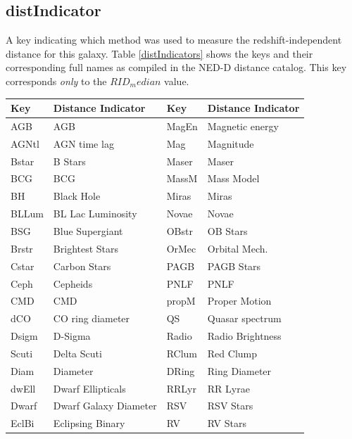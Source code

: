 \documentclass[iop]{emulateapj-rtx4}
\begin{document}
\subsection{distIndicator} \label{distIndicator}
A key indicating which method was used to measure the redshift-independent distance for this galaxy. Table \ref{distIndicators} shows the keys and their corresponding full names as compiled in the NED-D distance catalog. This key corresponds \textit{only} to the $RID_median$ value.

\begin{table}[ht]\footnotesize
\begin{center}
\begin{tabular}{l l | l l}
 \hline \hline
    Key       &	Distance Indicator		&	Key		&	Distance Indicator 	\\
  \hline \hline 
    AGB	&	AGB					&	MagEn    	&	Magnetic energy    	\\
    AGNtl	&	AGN time lag    		&	Mag    	&	Magnitude    	\\
    Bstar	&	B Stars				&	Maser    	&	Maser    	\\
    BCG	&	BCG					&	MassM    	&	Mass Model    	\\
    BH	&	Black Hole			&	Miras   	&	Miras    	\\
    BLLum	&	BL Lac Luminosity		&	Novae    	&	Novae    	\\
    BSG    	&	Blue Supergiant		&	OBstr    	&	OB Stars    	\\
    Brstr    	&	Brightest Stars    		&	OrMec    	&	Orbital Mech.    	\\
    Cstar    	&	Carbon Stars    			&	PAGB    	&	PAGB Stars    	\\
    Ceph    	&	Cepheids				&	PNLF    	&	PNLF    	\\
    CMD    	&	CMD					&	propM    	&	Proper Motion    	\\
    dCO    	&	CO ring diameter		&	QS    	&	Quasar spectrum    	\\
    Dsigm	&	D-Sigma				&	Radio    	&	Radio Brightness    	\\
    Scuti	&	Delta Scuti    			&	RClum    	&	Red Clump    	\\
    Diam	&	Diameter				&	DRing    	&	Ring Diameter    	\\
    dwEll	&	Dwarf Ellipticals    		&	RRLyr    	&	RR Lyrae    	\\
    Dwarf	&	Dwarf Galaxy Diameter	&	RSV    	&	RSV Stars    	\\
    EclBi	&	Eclipsing Binary		&	RV    	&	RV Stars    	\\

\end{tabular}
\end{center}
\end{table}
\end{document}
